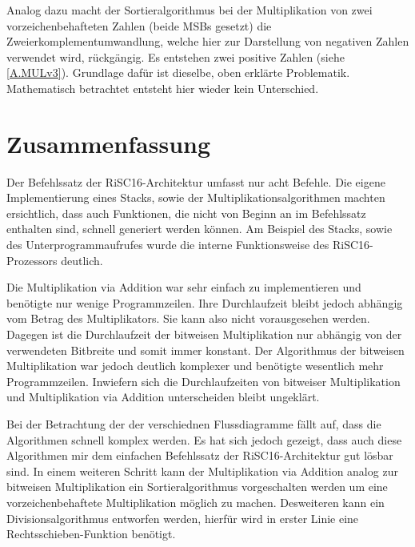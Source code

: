 \documentclass[fleqn, a4paper, 11pt]{article}       %
\begin{document}
Analog dazu macht der Sortieralgorithmus bei der Multiplikation von zwei vorzeichenbehafteten Zahlen (beide MSBs gesetzt) die Zweierkomplementumwandlung, welche hier zur Darstellung von negativen Zahlen verwendet wird, rückgängig. Es entstehen zwei positive Zahlen (siehe \ref{A.MULv3}). Grundlage dafür ist dieselbe, oben erklärte Problematik. Mathematisch betrachtet entsteht hier wieder kein Unterschied.


\section{Zusammenfassung}

Der Befehlssatz der RiSC16-Architektur umfasst nur acht Befehle. Die eigene Implementierung eines Stacks, sowie der Multiplikationsalgorithmen machten ersichtlich, dass auch Funktionen, die nicht von Beginn an im Befehlssatz enthalten sind, schnell generiert werden können. Am Beispiel des Stacks, sowie des Unterprogrammaufrufes wurde die interne Funktionsweise des RiSC16-Prozessors deutlich.

Die Multiplikation via Addition war sehr einfach zu implementieren und benötigte nur wenige Programmzeilen. Ihre Durchlaufzeit bleibt jedoch abhängig vom Betrag des Multiplikators. Sie kann also nicht vorausgesehen werden. Dagegen ist die Durchlaufzeit der bitweisen Multiplikation nur abhängig von der verwendeten Bitbreite und somit immer konstant. Der Algorithmus der bitweisen Multiplikation war jedoch deutlich komplexer und benötigte wesentlich mehr Programmzeilen. Inwiefern sich die Durchlaufzeiten von bitweiser Multiplikation und Multiplikation via Addition unterscheiden bleibt ungeklärt.

Bei der Betrachtung der der verschiednen Flussdiagramme fällt auf, dass die Algorithmen schnell komplex werden. Es hat sich jedoch gezeigt, dass auch diese Algorithmen mir dem einfachen Befehlssatz der RiSC16-Architektur gut lösbar sind. In einem weiteren Schritt kann der Multiplikation via Addition analog zur bitweisen Multiplikation ein Sortieralgorithmus vorgeschalten werden um eine vorzeichenbehaftete Multiplikation möglich zu machen. Desweiteren kann ein Divisionsalgorithmus entworfen werden, hierfür wird in erster Linie eine Rechtsschieben-Funktion benötigt.
\end{document}
